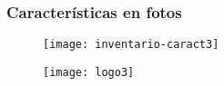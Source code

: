 \documentclass[12pt]{beamer}
\begin{document}
\begin{frame}
\frametitle{Características en fotos}
\begin{figure}
   	\texttt{[image: inventario-caract3]}
\end{figure}
\end{frame}
\begin{frame}
\begin{figure}
   	\texttt{[image: logo3]}
\end{figure}
\end{frame}
\end{document}
